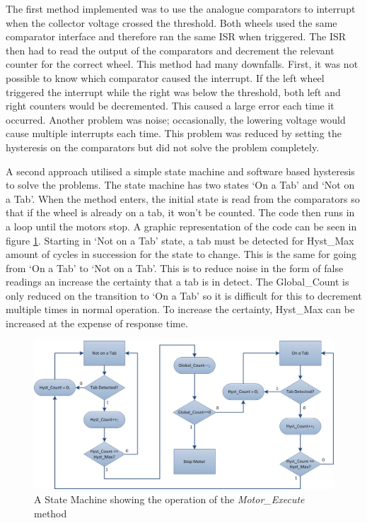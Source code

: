 The first method implemented was to use the analogue comparators to interrupt when the collector voltage crossed the threshold. Both wheels used the same comparator interface and therefore ran the same ISR when triggered. The ISR then had to read the output of the comparators and decrement the relevant counter for the correct wheel. This method had many downfalls. First, it was not possible to know which comparator caused the interrupt. If the left wheel triggered the interrupt while the right was below the threshold, both left and right counters would be decremented. This caused a large error each time it occurred. Another problem was noise; occasionally, the lowering voltage would cause multiple interrupts each time. This problem was reduced by setting the hysteresis on the comparators but did not solve the problem completely. 

A second approach utilised a simple state machine and software based hysteresis to solve the problems. The state machine has two states `On a Tab' and `Not on a Tab'. When the method enters, the initial state is read from the comparators so that if the wheel is already on a tab, it won't be counted. The code then runs in a loop until the motors stop. A graphic representation of the code can be seen in figure \ref{fig:StateMachine}. Starting in `Not on a Tab' state, a tab must be detected for Hyst\_Max amount of cycles in succession for the state to change. This is the same for going from `On a Tab' to `Not on a Tab'. This is to reduce noise in the form of false readings an increase the certainty that a tab is in detect. The Global\_Count is only reduced on the transition to `On a Tab' so it is difficult for this to decrement multiple times in normal operation. To increase the certainty, Hyst\_Max can be increased at the expense of response time. 


\begin{figure}
\includegraphics[width=\textwidth]{Figures/ASM.jpg}
\caption{A State Machine showing the operation of the \textit{Motor\_Execute} method}
\label{fig:StateMachine}
\end{figure}


